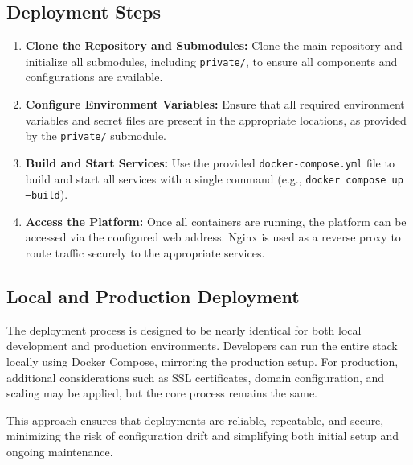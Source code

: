 \subsection{Deployment Steps}
\begin{enumerate}
    \item \textbf{Clone the Repository and Submodules:} Clone the main repository and initialize all submodules, including \texttt{private/}, to ensure all components and configurations are available.
    \item \textbf{Configure Environment Variables:} Ensure that all required environment variables and secret files are present in the appropriate locations, as provided by the \texttt{private/} submodule.
    \item \textbf{Build and Start Services:} Use the provided \texttt{docker-compose.yml} file to build and start all services with a single command (e.g., \texttt{docker compose up --build}).
    \item \textbf{Access the Platform:} Once all containers are running, the platform can be accessed via the configured web address. Nginx is used as a reverse proxy to route traffic securely to the appropriate services.
\end{enumerate}

\subsection{Local and Production Deployment}
The deployment process is designed to be nearly identical for both local development and production environments. Developers can run the entire stack locally using Docker Compose, mirroring the production setup. For production, additional considerations such as SSL certificates, domain configuration, and scaling may be applied, but the core process remains the same.

This approach ensures that deployments are reliable, repeatable, and secure, minimizing the risk of configuration drift and simplifying both initial setup and ongoing maintenance.
